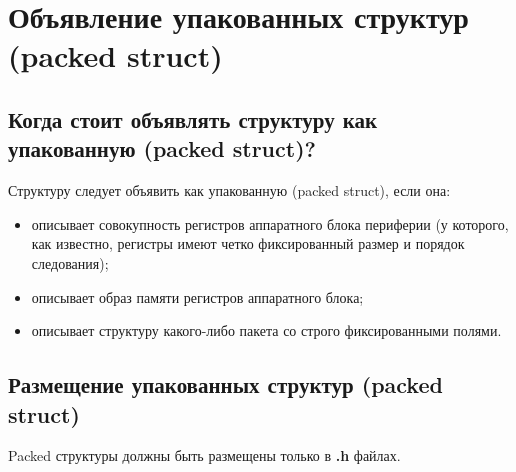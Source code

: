 \section{Объявление упакованных структур (packed struct)}\label{struct:p}
\subsection{Когда стоит объявлять структуру как упакованную (packed struct)?}
Структуру следует объявить как упакованную (packed struct), если она:
\begin{itemize}
	\item описывает совокупность регистров аппаратного блока периферии (у которого, как известно, регистры имеют четко фиксированный размер и порядок следования);
	\item описывает образ памяти регистров аппаратного блока;
	\item описывает структуру какого-либо пакета со строго фиксированными полями.
\end{itemize}

\subsection{Размещение упакованных структур (packed struct)}
Packed структуры должны быть размещены только в \textbf{.h} файлах. 


